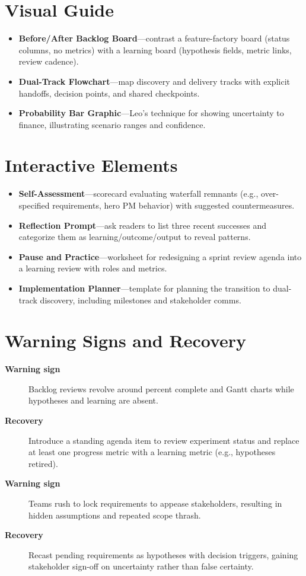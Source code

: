 \section{Visual Guide}
\label{sec:failures-visuals}
\begin{itemize}
    \item \textbf{Before/After Backlog Board}—contrast a feature-factory board (status columns, no metrics) with a learning board (hypothesis fields, metric links, review cadence).
    \item \textbf{Dual-Track Flowchart}—map discovery and delivery tracks with explicit handoffs, decision points, and shared checkpoints.
    \item \textbf{Probability Bar Graphic}—Leo’s technique for showing uncertainty to finance, illustrating scenario ranges and confidence.
\end{itemize}

\section{Interactive Elements}
\label{sec:failures-interactive}
\begin{itemize}
    \item \textbf{Self-Assessment}—scorecard evaluating waterfall remnants (e.g., over-specified requirements, hero PM behavior) with suggested countermeasures.
    \item \textbf{Reflection Prompt}—ask readers to list three recent successes and categorize them as learning/outcome/output to reveal patterns.
    \item \textbf{Pause and Practice}—worksheet for redesigning a sprint review agenda into a learning review with roles and metrics.
    \item \textbf{Implementation Planner}—template for planning the transition to dual-track discovery, including milestones and stakeholder comms.
\end{itemize}

\section{Warning Signs and Recovery}
\label{sec:failures-warning}
\begin{description}
    \item[\textbf{Warning sign}] Backlog reviews revolve around percent complete and Gantt charts while hypotheses and learning are absent.
    \item[\textbf{Recovery}] Introduce a standing agenda item to review experiment status and replace at least one progress metric with a learning metric (e.g., hypotheses retired).
    \item[\textbf{Warning sign}] Teams rush to lock requirements to appease stakeholders, resulting in hidden assumptions and repeated scope thrash.
    \item[\textbf{Recovery}] Recast pending requirements as hypotheses with decision triggers, gaining stakeholder sign-off on uncertainty rather than false certainty.
\end{description}

